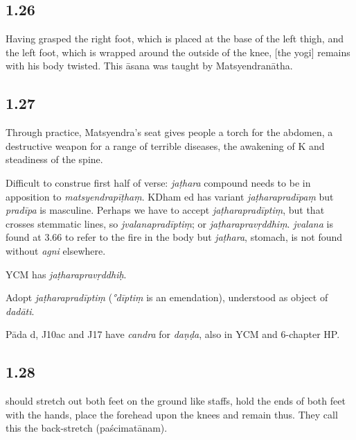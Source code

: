 \begin{ekdosis}
\subsection*{1.26}
\begin{translation}[hp01_026]
Having grasped the right foot, which is placed at the base of the left thigh, and the left foot, which is wrapped around the outside of the knee, [the yogi] remains with his body twisted. This āsana was taught by Matsyendranātha.
\end{translation}

\subsection*{1.27}
\begin{translation}[hp01_027]
Through practice, Matsyendra's seat gives people a torch for the abdomen, a destructive weapon for a range of terrible diseases, the awakening of K and steadiness of the spine.
\end{translation}

\begin{philcomm}[hp01_027]
Difficult to construe first half of verse: \emph{jaṭhara} compound needs to be in apposition to \emph{matsyendrapīṭhaṃ}. KDham ed has variant \emph{jaṭharapradīpaṃ} but \emph{pradīpa} is masculine. Perhaps we have to accept \emph{jaṭharapradīptiṃ}, but that crosses stemmatic lines, so \emph{jvalanapradīptiṃ}; or \emph{jaṭharapravṛddhiṃ}. \emph{jvalana} is found at 3.66 to refer to the fire in the body but \emph{jaṭhara}, stomach, is not found without \emph{agni} elsewhere.

YCM has \emph{jaṭharapravṛddhiḥ}.

Adopt \emph{jaṭharapradīptiṃ} (\emph{°dīptiṃ} is an emendation), understood as object of \emph{dadāti}.

Pāda d, J10ac and J17 have \emph{candra} for \emph{daṇḍa}, also in YCM and 6-chapter HP.
\end{philcomm}

\subsection*{1.28}
\begin{translation} should stretch out both feet on the ground like staffs, hold the ends of both feet with the hands, place the forehead upon the knees and remain thus. They call this the back-stretch (paścimatānam).
\end{translation}


\end{ekdosis}
